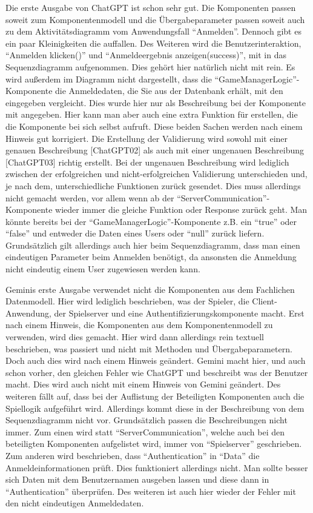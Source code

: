 Die erste Ausgabe von ChatGPT ist schon sehr gut. Die Komponenten passen soweit zum Komponentenmodell und die Übergabeparameter passen 
soweit auch zu dem Aktivitätsdiagramm vom Anwendungsfall ``Anmelden''. Dennoch gibt es ein paar Kleinigkeiten die auffallen. 
Des Weiteren wird die Benutzerinteraktion, ``Anmelden klicken()'' und ``Anmeldeergebnis anzeigen(success)'', mit in das 
Sequenzdiagramm aufgenommen. Dies gehört hier natürlich nicht mit rein. Es wird außerdem im Diagramm nicht dargestellt, dass 
die ``GameManagerLogic''-Komponente die Anmeldedaten, die Sie aus der Datenbank erhält, mit den eingegeben vergleicht. Dies 
wurde hier nur als Beschreibung bei der Komponente mit angegeben. Hier kann man aber auch eine extra Funktion für erstellen, 
die die Komponente bei sich selbst aufruft. Diese beiden Sachen werden nach einem Hinweis gut korrigiert. Die Erstellung 
der Validierung wird sowohl mit einer genauen Beschreibung [ChatGPT02] als auch mit einer ungenauen Beschreibung 
[ChatGPT03] richtig erstellt. Bei der ungenauen Beschreibung wird lediglich zwischen der erfolgreichen und 
nicht-erfolgreichen Validierung unterschieden und, je nach dem, unterschiedliche Funktionen zurück gesendet. Dies muss 
allerdings nicht gemacht werden, vor allem wenn ab der ``ServerCommunication''-Komponente wieder immer die gleiche 
Funktion oder Response zurück geht. Man könnte bereits bei der ``GameManagerLogic''-Komponente z.B. 
ein ``true'' oder ``false'' und entweder die Daten eines Users oder ``null'' zurück liefern. Grundsätzlich gilt allerdings 
auch hier beim Sequenzdiagramm, dass man einen eindeutigen Parameter beim Anmelden benötigt, da ansonsten die Anmeldung 
nicht eindeutig einem User zugewiesen werden kann.

Geminis erste Ausgabe verwendet nicht die Komponenten aus dem Fachlichen Datenmodell. Hier wird lediglich beschrieben, was 
der Spieler, die Client-Anwendung, der Spielserver und eine Authentifizierungskomponente macht. Erst nach einem Hinweis, 
die Komponenten aus dem Komponentenmodell zu verwenden, wird dies gemacht. Hier wird dann allerdings rein textuell 
beschrieben, was passiert und nicht mit Methoden und Übergabeparametern. Doch auch dies wird nach einem Hinweis geändert.
Gemini macht hier, und auch schon vorher, den gleichen Fehler wie ChatGPT und beschreibt was der Benutzer macht. Dies wird 
auch nicht mit einem Hinweis von Gemini geändert. Des weiteren fällt auf, dass bei der Auflistung der Beteiligten Komponenten 
auch die Spiellogik aufgeführt wird. Allerdings kommt diese in der Beschreibung von dem Sequenzdiagramm nicht vor. Grundsätzlich
passen die Beschreibungen nicht immer. Zum einen wird statt ``ServerCommunication'', welche auch bei den beteiligten Komponenten 
aufgelistet wird, immer von ``Spielserver'' geschrieben. Zum anderen wird beschrieben, dass ``Authentication'' in ``Data'' die 
Anmeldeinformationen prüft. Dies funktioniert allerdings nicht. Man sollte besser sich Daten mit dem Benutzernamen ausgeben 
lassen und diese dann in ``Authentication'' überprüfen. Des weiteren ist auch hier wieder der Fehler mit den nicht eindeutigen 
Anmeldedaten.

